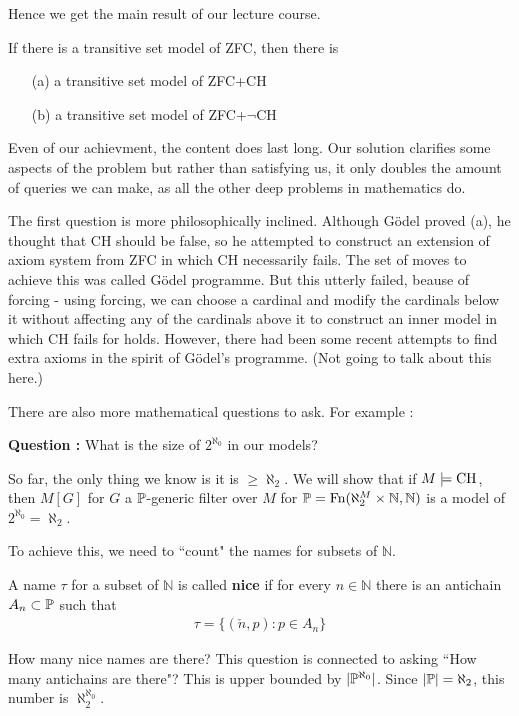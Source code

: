 \documentclass[12pt,a4paper]{article}
\begin{document}
Hence we get the main result of our lecture course.
\s

\corr If there is a transitive set model of ZFC, then there is
\begin{itemize}
\item[(a)] a transitive set model of ZFC+CH
\item[(b)] a transitive set model of ZFC+$\neg$CH
\end{itemize}
\s

Even of our achievment, the content does last long. Our solution clarifies some aspects of the problem but rather than satisfying us, it only doubles the amount of queries we can make, as all the other deep problems in mathematics do. 
\s

The first question is more philosophically inclined. Although G\"odel proved (a), he thought that CH should be false, so he attempted to construct an extension of axiom system from ZFC in which CH necessarily fails. The set of moves to achieve this was called G\"odel programme. But this utterly failed, beause of forcing - using forcing, we can choose a cardinal and modify the cardinals below it without affecting any of the cardinals above it to construct an inner model in which CH fails for holds. However, there had been some recent attempts to find extra axioms in the spirit of G\"odel's programme. (Not going to talk about this here.)
\s

There are also more mathematical questions to ask. For example :
\s

\textbf{Question :} What is the size of $2^{\aleph_0}$ in our models?

\quad So far, the only thing we know is it is $\geq \aleph_2$. We will show that if $M\models \text{CH}$, then $M[G]$ for $G$ a $\mathbb{P}$-generic filter over $M$ for $\mathbb{P} = \text{Fn}(\aleph_2^M \times \mathbb{N}, \mathbb{N})$ is a model of $2^{\aleph_0} = \aleph_2$.

\quad To achieve this, we need to ``count" the names for subsets of $\mathbb{N}$.
\s

 A name $\tau$ for a subset of $\mathbb{N}$ is called \textbf{nice} if for every $n\in \mathbb{N}$ there is an antichain $A_n \subset \mathbb{P}$ such that
\begin{align*}
\tau = \{(\check{n}, p) : p\in A_n \}
\end{align*}
\s

How many nice names are there? This question is connected to asking ``How many antichains are there"? This is upper bounded by $|\mathbb{P}^{\aleph_0}|$. Since $|\mathbb{P}| = \aleph_2$, this number is $\aleph_2^{\aleph_0}$.
\end{document}

